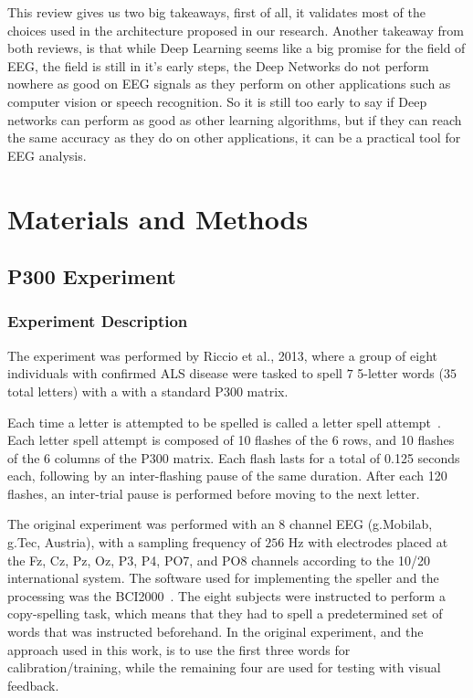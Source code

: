\documentclass[conference]{IEEEtran}
\begin{document}
This review gives us two big takeaways, first of all, it validates most of the choices used in the architecture proposed in our research. 
Another takeaway from both reviews, is that while Deep Learning seems like a big promise for the field of EEG, the field is still in it's early steps, the Deep Networks do not perform nowhere as good on EEG signals as they perform on other applications such as computer vision  or speech recognition. So it is still too early to say if Deep networks can perform as good as other learning algorithms, but if they can reach the same accuracy as they do on other applications, it can be a practical tool for EEG analysis.


\section{Materials and Methods}

\subsection{P300 Experiment}
\subsubsection{Experiment Description}
The experiment was performed by Riccio et al., 2013\cite{riccio2013}, where a group of eight individuals with confirmed ALS disease were tasked to spell $7$ 5-letter words ($35$ total letters) with a with a standard P300 matrix.  

Each time a letter is attempted to be spelled is called a letter spell attempt~\cite{Antonietti.etal2021}. Each letter spell attempt is composed of 10 flashes of the 6 rows, and 10 flashes of the 6 columns of the P300 matrix. Each flash lasts for a total of 0.125 seconds each, following by an inter-flashing pause of the same duration. After each 120 flashes, an inter-trial pause is performed before moving to the next letter.

The original experiment was performed with an 8 channel EEG (g.Mobilab, g.Tec, Austria), with a sampling frequency of $256$ Hz with electrodes placed at the Fz, Cz, Pz, Oz, P3, P4, PO7, and PO8 channels according to the 10/20 international system. The software used for  implementing the speller and the processing was the BCI2000~\cite{schalk2004}. The eight subjects were instructed to perform a copy-spelling task, which means that they had to spell a predetermined set of words that was instructed beforehand.  In the original experiment, and the approach used in this work, is to use the first three words for calibration/training, while the remaining four are used for testing with visual feedback.
\end{document}
